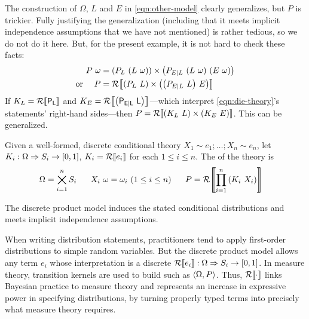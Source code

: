The construction of $\Omega$, $L$ and $E$ in \eqref{eqn:other-model} clearly generalizes, but $P$ is trickier. Fully justifying the generalization (including that it meets implicit independence assumptions that we have not mentioned) is rather tedious, so we do not do it here. But, for the present example, it is not hard to check these facts:
\begin{equation}
\begin{split}
	{P}\ {\omega} &= {\left({P_L}\ {\left({L}\ {\omega}\right)}\right)} \times {\left({P_{E|L}}\ {\left({L}\ {\omega}\right)}\ {\left({E}\ {\omega}\right)}\right)} \\
	\text{or}\ \ \ \  P &= \mathcal{R}\!\left\llbracket{\left({P_L}\ {L}\right) \times \left({\left({P_{E|L}}\ {L}\right)}\ {E}\right)}\right\rrbracket
\end{split}
\end{equation}
If $K_L = \mathcal{R}\!\left\llbracket{\mathsf{P_L}}\right\rrbracket$ and $K_E = \mathcal{R}\!\left\llbracket{\mathsf{\left({P_{E|L}}\ {L}\right)}}\right\rrbracket$---which interpret \eqref{eqn:die-theory}'s statements' right-hand sides---then $P = \mathcal{R}\!\left\llbracket{\left({K_L}\ {L}\right) \times\left({K_E}\ {E}\right)}\right\rrbracket$. This can be generalized.

\begin{definition}
\label{def:discrete-product-model}
Given a well-formed, discrete conditional theory $X_1 \sim e_1; \dots; X_n \sim e_n$, let $K_i : \Omega \Rightarrow S_i \to [0,1]$, $K_i = \mathcal{R}\!\left\llbracket{e_i}\right\rrbracket$ for each $1 \le i \le n$. The  of the theory is
\begin{equation}
\begin{split}
	\Omega &= \bigtimes_{i=1}^n S_i\;\;\;\;\;\;
	{X_i}\ {\omega} = \omega_i\ (1 \le i \le n)\;\;\;\;\;\;
	P = \mathcal{R}\!\left\llbracket{\prod_{i=1}^n \left({K_i}\ {X_i}\right)}\right\rrbracket
\end{split}
\label{eqn:product-model}
\end{equation}
\end{definition}

\begin{theorem}
The discrete product model induces the stated conditional distributions and meets implicit independence assumptions.
\end{theorem}

When writing distribution statements, practitioners tend to apply first-order distributions to simple random variables. But the discrete product model allows any \targetlang term $e_i$ whose interpretation is a discrete  $\mathcal{R}\!\left\llbracket{e_i}\right\rrbracket : \Omega \Rightarrow S_i \to [0,1]$. In measure theory, transition kernels are used to build  such as $\langle{\Omega,P}\rangle$. Thus, $\mathcal{R}\!\left\llbracket{\cdot}\right\rrbracket$ links Bayesian practice to measure theory and represents an increase in expressive power in specifying distributions, by turning properly typed \targetlang terms into precisely what measure theory requires.

